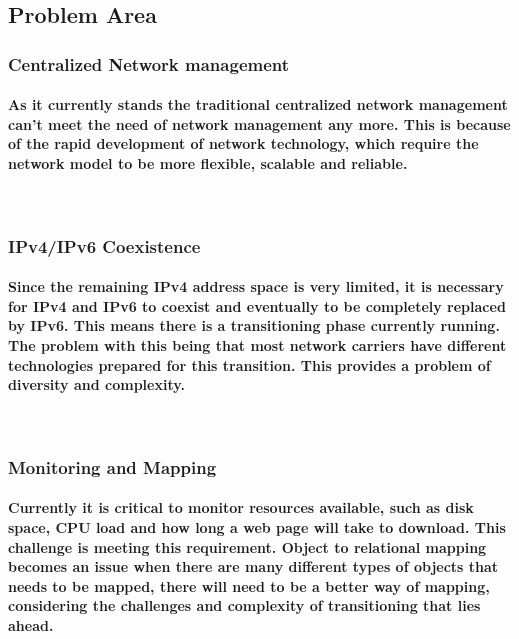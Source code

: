 
%
\subsection{Problem Area}
   \subsubsection{Centralized Network management}
   	\paragraph{As it currently stands the traditional centralized network management can't meet the need of network management any more. This is because of the rapid development of network technology, which require the network model to be more flexible, scalable and reliable.}\cite{IEEE} \\
   \subsubsection{IPv4/IPv6 Coexistence}
	\paragraph{Since the remaining IPv4 address space is very limited, it is necessary for IPv4 and IPv6 to coexist and eventually to be completely replaced by IPv6. This means there is a transitioning phase currently running. The problem with this being that most network carriers have different technologies prepared for this transition. This provides a problem of diversity and complexity.}\\
	\subsubsection{Monitoring and Mapping}
	 \paragraph{Currently it is critical to monitor resources available, such as disk space, CPU load and how long a web page will take to download. This challenge is meeting this requirement.
	 Object to relational mapping becomes an issue when there are many different types of objects that needs to be mapped, there will need to be a better way of mapping, considering the challenges and complexity of transitioning that lies ahead.}

%